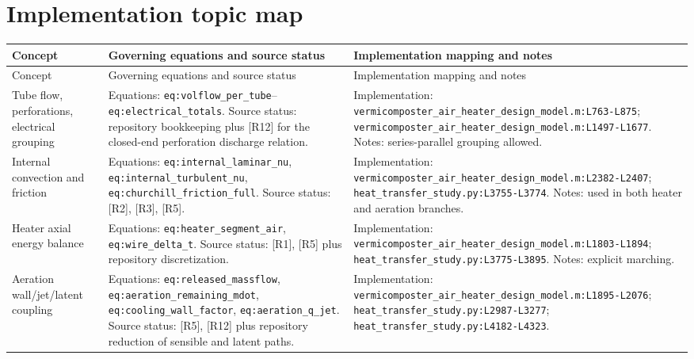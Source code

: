 \documentclass[11pt]{article}
\newcommand{\srcref}[1]{\nolinkurl{#1}}
\newcommand{\code}[1]{\nolinkurl{#1}}
\begin{document}
\section*{Implementation topic map}
\begingroup
\small
\renewcommand{\arraystretch}{1.08}
\begin{longtable}{@{}L{0.16\textwidth}L{0.28\textwidth}L{0.48\textwidth}@{}}
\toprule
Concept & Governing equations and source status & Implementation mapping and notes \\
\midrule
\endfirsthead
\toprule
Concept & Governing equations and source status & Implementation mapping and notes \\
\midrule
\endhead
Tube flow, perforations, electrical grouping &
Equations: \code{eq:volflow\_per\_tube}--\code{eq:electrical\_totals}. \newline
Source status: repository bookkeeping plus [R12] for the closed-end perforation discharge relation. &
Implementation: \srcref{vermicomposter_air_heater_design_model.m:L763-L875}; \srcref{vermicomposter_air_heater_design_model.m:L1497-L1677}. \newline
Notes: series-parallel grouping allowed. \\
Internal convection and friction &
Equations: \code{eq:internal\_laminar\_nu}, \code{eq:internal\_turbulent\_nu}, \code{eq:churchill\_friction\_full}. \newline
Source status: [R2], [R3], [R5]. &
Implementation: \srcref{vermicomposter_air_heater_design_model.m:L2382-L2407}; \srcref{heat_transfer_study.py:L3755-L3774}. \newline
Notes: used in both heater and aeration branches. \\
Heater axial energy balance &
Equations: \code{eq:heater\_segment\_air}, \code{eq:wire\_delta\_t}. \newline
Source status: [R1], [R5] plus repository discretization. &
Implementation: \srcref{vermicomposter_air_heater_design_model.m:L1803-L1894}; \srcref{heat_transfer_study.py:L3775-L3895}. \newline
Notes: explicit marching. \\
Aeration wall/jet/latent coupling &
Equations: \code{eq:released\_massflow}, \code{eq:aeration\_remaining\_mdot}, \code{eq:cooling\_wall\_factor}, \code{eq:aeration\_q\_jet}. \newline
Source status: [R5], [R12] plus repository reduction of sensible and latent paths. &
Implementation: \srcref{vermicomposter_air_heater_design_model.m:L1895-L2076}; \srcref{heat_transfer_study.py:L2987-L3277}; \srcref{heat_transfer_study.py:L4182-L4323}. \newline

\end{longtable}
\end{document}
